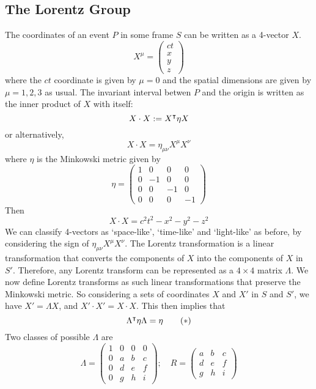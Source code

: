 \documentclass{article}
\begin{document}
\subsection{The Lorentz Group}
The coordinates of an event $P$ in some frame $S$ can be written as a 4-vector $X$.
\[ X^\mu = \begin{pmatrix}
		ct \\ x \\ y \\ z
	\end{pmatrix} \]
where the $ct$ coordinate is given by $\mu = 0$ and the spatial dimensions are given by $\mu = 1, 2, 3$ as usual. The invariant interval betwen $P$ and the origin is written as the inner product of $X$ with itself:
\[ X \cdot X := X^\intercal \eta X \]
or alternatively,
\[ X \cdot X = \eta_{\mu\nu} X^\mu X^\nu \]
where $\eta$ is the Minkowski metric given by
\[ \eta = \begin{pmatrix}
		1 & 0  & 0  & 0  \\
		0 & -1 & 0  & 0  \\
		0 & 0  & -1 & 0  \\
		0 & 0  & 0  & -1
	\end{pmatrix} \]
Then
\[ X \cdot X = c^2t^2 - x^2 - y^2 - z^2 \]
We can classify 4-vectors as `space-like', `time-like' and `light-like' as before, by considering the sign of $\eta_{\mu\nu}X^\mu X^\nu$. The Lorentz transformation is a linear transformation that converts the components of $X$ into the components of $X$ in $S'$. Therefore, any Lorentz transform can be represented as a $4\times 4$ matrix $\Lambda$. We now define Lorentz transforms as such linear transformations that preserve the Minkowski metric. So considering a sets of coordinates $X$ and $X'$ in $S$ and $S'$, we have $X' = \Lambda X$, and $X' \cdot X' = X \cdot X$. This then implies that
\begin{equation}
	\Lambda^\intercal \eta \Lambda = \eta \tag{$\ast$}
\end{equation}
Two classes of possible $\Lambda$ are
\[ \Lambda = \begin{pmatrix}
		1 & 0 & 0 & 0 \\
		0 & a & b & c \\
		0 & d & e & f \\
		0 & g & h & i
	\end{pmatrix};\quad R = \begin{pmatrix}
		a & b & c \\
		d & e & f \\
		g & h & i
	\end{pmatrix} \]
\end{document}
